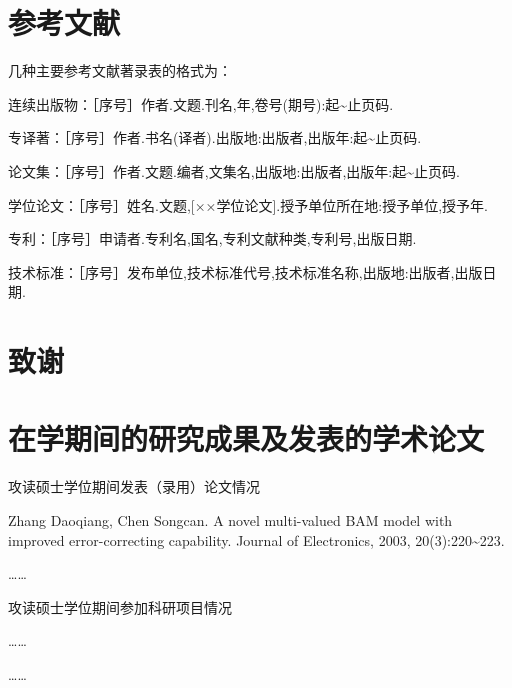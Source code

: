 \chapter{参考文献}
\setlength{\parindent}{20.6bp}
几种主要参考文献著录表的格式为：

连续出版物：［序号］作者.文题.刊名,年,卷号(期号):起\textasciitilde 止页码.

专译著：［序号］作者.书名(译者).出版地:出版者,出版年:起\textasciitilde 止页码.

论文集：［序号］作者.文题.编者,文集名,出版地:出版者,出版年:起\textasciitilde 止页码.

学位论文：［序号］姓名.文题,[××学位论文].授予单位所在地:授予单位,授予年.

专利：［序号］申请者.专利名,国名,专利文献种类,专利号,出版日期.

技术标准：［序号］发布单位,技术标准代号,技术标准名称,出版地:出版者,出版日期.

\clearpage


\chapter[致\space 谢]{致\ccwd{}谢}

\clearpage


\begingroup\sloppy
\chapter{在学期间的研究成果及发表的学术论文}
{\par\noindent\WordHei\fontsize{12bp}{20bp}\selectfont 攻读硕士学位期间发表（录用）论文情况\par}
Zhang Daoqiang, Chen Songcan. A novel multi-valued BAM model with improved error-correcting capability. Journal of Electronics, 2003, 20(3):220\textasciitilde223.

……
{\par\noindent\WordHei\fontsize{12bp}{20bp}\selectfont 攻读硕士学位期间参加科研项目情况\par}
……
\endgroup

\clearpage



\ThesisAppendixHeading{\AppendixPlaceholder}
……
\par
